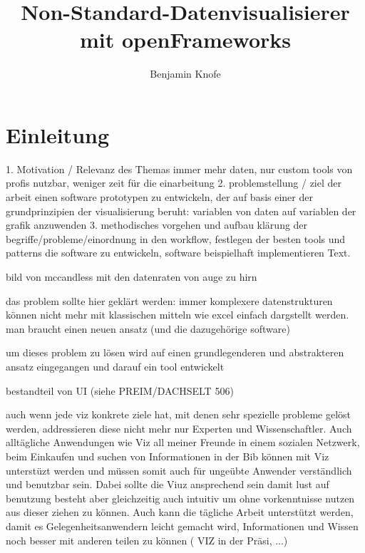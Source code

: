 \documentclass[a4paper, 12pt, onepage, pdftex, headsepline, footsepline]{scrreprt}
\begin{document}
\title{Non-Standard-Datenvisualisierer mit openFrameworks}
\author{Benjamin Knofe}
\subject{Diplomarbeit}
\publishers{Hochschule für Technik, Wirtschaft und Kultur Leipzig}
\dedication{viele nette Leute}
\maketitle
\tableofcontents
\chapter{Einleitung}
\label{sec:testi}

1. Motivation / Relevanz des Themas
immer mehr daten, nur custom tools von profis nutzbar, weniger zeit für die einarbeitung
2. problemstellung / ziel der arbeit
einen software prototypen zu entwickeln, der auf basis einer der grundprinzipien der visualisierung beruht: variablen von daten auf variablen der grafik anzuwenden
3. methodisches vorgehen und aufbau
klärung der begriffe/probleme/einordnung in den workflow, festlegen der besten tools und patterns die software zu entwickeln, software beispielhaft implementieren Text.

bild von mccandless mit den datenraten von auge zu hirn

das problem sollte hier geklärt werden:
immer komplexere datenstrukturen können nicht mehr mit klassischen mitteln wie excel einfach dargstellt werden. man braucht einen neuen ansatz (und die dazugehörige software)

um dieses problem zu lösen wird auf einen grundlegenderen und abstrakteren ansatz eingegangen und darauf ein tool entwickelt

bestandteil von UI (siehe PREIM/DACHSELT 506)

auch wenn jede viz konkrete ziele hat, mit denen sehr spezielle probleme gelöst werden, addressieren diese nicht mehr nur Experten und Wissenschaftler. Auch alltägliche Anwendungen wie Viz all meiner Freunde in einem sozialen Netzwerk, beim Einkaufen und suchen von Informationen in der Bib können mit Viz unterstüzt werden und müssen somit auch für ungeübte Anwender verständlich und benutzbar sein. Dabei sollte die Viuz ansprechend sein damit lust auf benutzung besteht aber gleichzeitig auch intuitiv um ohne vorkenntnisse nutzen aus dieser ziehen zu können.
Auch kann die tägliche Arbeit unterstützt werden, damit es Gelegenheitsanwendern leicht gemacht wird, Informationen und Wissen noch besser mit anderen teilen zu können ( VIZ in der Präsi, ...)
\end{document}
